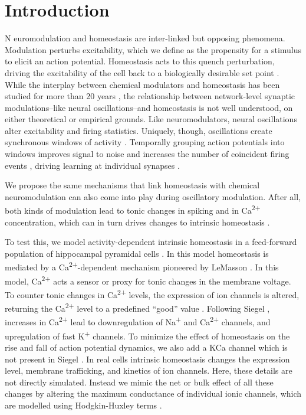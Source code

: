 \documentclass{article}
\begin{document}
\section*{Introduction}
\lettrine[loversize=0,nindent=0,realheight=true]{N}{} euromodulation and homeostasis are inter-linked but opposing phenomena. Modulation perturbs excitability, which we define as the propensity for a stimulus to elicit an action potential. Homeostasis acts to this quench perturbation, driving the excitability of the cell back to a biologically desirable set point \cite{LeMasson1993,Abbott1993}. While the interplay between chemical modulators and homeostasis has been studied for more than 20 years \cite{LeMasson1993,Abbott1993,Golowasch1999,Marder2014,Marder2015,Gutierrez2013}, the relationship between network-level synaptic modulations--like neural oscillations--and homeostasis is not well understood, on either theoretical or empirical grounds. Like neuromodulators, neural oscillations alter excitability and firing statistics. Uniquely, though, oscillations create synchronous windows of activity \cite{Lisman2013,Voytek2015}. Temporally grouping action potentials into windows improves signal to noise and increases the number of coincident firing events \cite{Chen2013,Zhou2015,Voytek2015a,Peterson2017}, driving learning at individual synapses \cite{Muller2011,Song2000,Markram1997}. 

We propose the same mechanisms that link homeostasis with chemical neuromodulation can also come into play during oscillatory modulation. After all, both kinds of modulation lead to tonic changes in spiking and in Ca\textsuperscript{2+} concentration, which can in turn drives changes to intrinsic homeostasis \cite{Liu1998}. 

To test this, we model activity-dependent intrinsic homeostasis in a feed-forward population of hippocampal pyramidal cells \cite{Siegel1994}. In this model homeostasis is mediated by a Ca\textsuperscript{2+}-dependent mechanism \cite{Golowasch1999,Marder2014,Marder2015,Gutierrez2013,OLeary2014} pioneered by LeMasson \cite{LeMasson1993,Abbott1993}. In this model, Ca\textsuperscript{2+} acts a sensor or proxy for tonic changes in the membrane voltage. To counter tonic changes in Ca\textsuperscript{2+} levels, the expression of ion channels is altered, returning the Ca\textsuperscript{2+} level to a predefined ``good'' value \cite{Golowasch1999,OLeary2013}. Following Siegel \cite{Siegel1994}, increases in Ca\textsuperscript{2+} lead to downregulation of Na\textsuperscript{+} and Ca\textsuperscript{2+} channels, and upregulation of fast K\textsuperscript{+} channels. To minimize the effect of homeostasis on the rise and fall of action potential dynamics, we also add a KCa channel which is not present in Siegel \citep{Siegel1994}. In real cells intrinsic homeostasis changes the expression level, membrane trafficking, and kinetics of ion channels. Here, these details are not directly simulated. Instead we mimic the net or bulk effect of all these changes by altering the maximum conductance of individual ionic channels, which are modelled using Hodgkin-Huxley terms \cite{LeMasson1993,OLeary2013,OLeary2014}.
\end{document}
